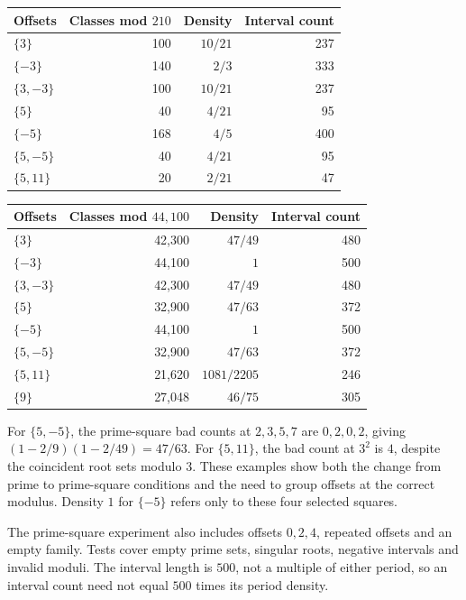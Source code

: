 \documentclass[11pt]{article}
\theoremstyle{definition}
\theoremstyle{remark}
\begin{document}
\begin{center}
\begin{tabular}{lrrr}
\toprule
Offsets & Classes mod $210$ & Density & Interval count\\
\midrule
$\{3\}$ &100&$10/21$&237\\
$\{-3\}$ &140&$2/3$&333\\
$\{3,-3\}$ &100&$10/21$&237\\
$\{5\}$ &40&$4/21$&95\\
$\{-5\}$ &168&$4/5$&400\\
$\{5,-5\}$ &40&$4/21$&95\\
$\{5,11\}$ &20&$2/21$&47\\
\bottomrule
\end{tabular}
\end{center}

\begin{center}
\begin{tabular}{lrrr}
\toprule
Offsets & Classes mod $44{,}100$ & Density & Interval count\\
\midrule
$\{3\}$ &42,300&$47/49$&480\\
$\{-3\}$ &44,100&$1$&500\\
$\{3,-3\}$ &42,300&$47/49$&480\\
$\{5\}$ &32,900&$47/63$&372\\
$\{-5\}$ &44,100&$1$&500\\
$\{5,-5\}$ &32,900&$47/63$&372\\
$\{5,11\}$ &21,620&$1081/2205$&246\\
$\{9\}$ &27,048&$46/75$&305\\
\bottomrule
\end{tabular}
\end{center}

For $\{5,-5\}$, the prime-square bad counts at $2,3,5,7$ are
$0,2,0,2$, giving $(1-2/9)(1-2/49)=47/63$.
For $\{5,11\}$, the bad count at $3^2$ is $4$, despite the coincident
root sets modulo $3$. These examples show both the change from prime
to prime-square conditions and the need to group offsets at the
correct modulus. Density $1$ for $\{-5\}$ refers only to these
four selected squares.

The prime-square experiment also includes offsets $0,2,4$, repeated
offsets and an empty family. Tests cover empty prime sets, singular
roots, negative intervals and invalid moduli. The interval length is
$500$, not a multiple of either period, so an interval count need not
equal $500$ times its period density.
\end{document}
